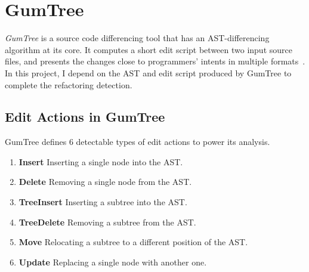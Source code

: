 \section{GumTree}

\textit{GumTree} is a source code differencing tool that has an AST-differencing algorithm at its core. It computes a short edit script between two input source files, and presents the changes close to programmers' intents in multiple formats~\cite{DBLP:conf/kbse/FalleriMBMM14}. In this project, I depend on the AST and edit script produced by GumTree to complete the refactoring detection.

\subsection{Edit Actions in GumTree}

GumTree defines 6 detectable types of edit actions to power its analysis.

\begin{enumerate}
	\item \textbf{Insert} Inserting a single node into the AST.
	\item \textbf{Delete} Removing a single node from the AST.
	\item \textbf{TreeInsert} Inserting a subtree into the AST.
	\item \textbf{TreeDelete} Removing a subtree from the AST.
	\item \textbf{Move} Relocating a subtree to a different position of the AST.
	\item \textbf{Update} Replacing a single node with another one.
\end{enumerate}
